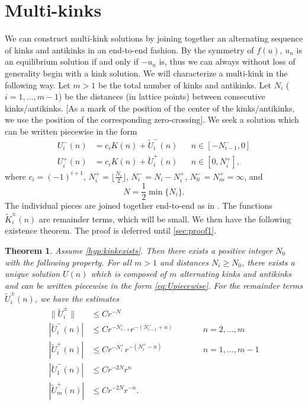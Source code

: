 \documentclass[12pt,reqno]{amsart}
\newtheorem{theorem}{Theorem}
\begin{document}
\section{Multi-kinks}\label{sec:multikink}

We can construct multi-kink solutions by joining together an alternating sequence of kinks and antikinks in an end-to-end fashion. By the symmetry of $f(u)$, $u_n$ is an equilibrium solution if and only if $-u_n$ is, thus we can always without loss of generality begin with a kink solution. We will characterize a multi-kink in the following way. Let $m > 1$ be the total number of kinks and antikinks. Let $N_i$ ($i = 1, \dots, m-1$) be the distances (in lattice points) between consecutive kinks/antikinks.
[As a mark of the position of the center of the kinks/antikinks,
we use the position of the corresponding zero-crossing].
We seek a solution which can be written piecewise in the form 
\begin{equation}\label{eq:Upiecewise}
\begin{aligned}
U_i^-(n) &= c_i K(n) + \tilde{U}_i^-(n) && n \in [-N_{i-1}^-, 0] \\
U_i^+(n) &= c_i K(n) + \tilde{U}_i^+(n) && n \in [0, N_i^+],
\end{aligned}
\end{equation}
where $c_i = (-1)^{i+1}$, $N_i^+ = \lfloor \frac{N_i}{2} \rfloor$, $N_i^- = N_i - N_i^+$, $N_0^- = N_m^+ = \infty$, and
\begin{equation}\label{defN}
N = \frac{1}{2} \min\{ N_i \}.
\end{equation}
The individual pieces are joined together end-to-end as in \cites{Sandstede1998,Parker2020}. The functions $\tilde{K}_i^\pm(n)$ are remainder terms, which will be small. We then have the following existence theorem. The proof is deferred until \cref{sec:proof1}.

\begin{theorem}\label{th:KaKexists}
Assume \cref{hyp:kinkexists}. Then there exists a positive integer $N_0$ with the following property. For all $m > 1$ and distances $N_i \geq N_0$, there exists a unique solution $U(n)$ which is composed of $m$ alternating kinks and antikinks and can be written piecewise in the form \cref{eq:Upiecewise}. For the remainder terms $\tilde{U}_i^\pm(n)$, we have the estimates
\begin{equation}\label{eq:Uestimates}
\begin{aligned}
\|\tilde{U}_i^\pm\| &\leq C r^{-N} \\
| \tilde{U}_i^-(n) | &\leq C r^{-N_{i-1}^-} r^{-(N_{i-1}^- + n)} && \qquad n = 2, \dots, m\\
|\tilde{U}_i^+(n)| &\leq C r^{-N_i^+} r^{-(N_i^+ - n)} && \qquad n = 1, \dots, m-1 \\
| \tilde{U}_1^-(n) | &\leq C r^{-2N} r^{n} \\
|\tilde{U}_m^+(n)| &\leq C r^{-2N} r^{-n} .
\end{aligned}
\end{equation}
\end{theorem}
\end{document}
